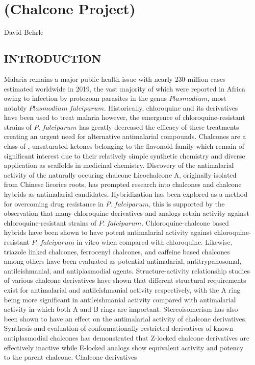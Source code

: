 \documentclass[11pt]{article}
\begin{document}
\linespread{1.25}
\raggedright
\setlength{\parskip}{2pt}
\setlength{\belowcaptionskip}{-8pt}
\def\citenumfont{\textit}
\renewcommand{\bibsection}{}

\section*{(Chalcone Project)}

David Behrle

\subsection*{INTRODUCTION}
Malaria remains a major public health issue with nearly 230 million cases estimated worldwide in 2019, the vast majority of which were reported in Africa owing to infection by protozoan parasites in the genus $Plasmodium$, most notably $Plasmodium\; falciparum$.\cite{Fikadu2023} Historically, chloroquine and its derivatives have been used to treat malaria however, the emergence of chloroquine-resistant strains of $P.\; falciparum$ has greatly decreased the efficacy of these treatments creating an urgent need for alternative antimalarial compounds.\cite{Fikadu2023,Yadav2012} Chalcones are a class of \textalpha,\textbeta-unsaturated ketones belonging to the flavonoid family which remain of significant interest due to their relatively simple synthetic chemistry and diverse application as scaffolds in medicinal chemistry.\cite{Qin2020} Discovery of the antimalarial activity of the naturally occuring chalcone Licochalcone A, originally isolated from Chinese licorice roots, has prompted research into chalcones and chalcone hybrids as antimalarial candidates.\cite{Cheng2020,Chen1994} Hybridization has been explored as a method for overcoming drug resistance in $P.\; falciparum$, this is supported by the observation that many chloroquine derivatives and analogs retain activity against chloroquine-resistant strains of $P.\; falciparum$.\cite{Cheng2020,Sashidhara2012} Chloroquine-chalcone based hybrids have been shown to have potent antimalarial activity against chloroquine-resistant $P.\; falciparum$ in vitro when compared with chloroquine.\cite{Sashidhara2012} Likewise, triazole linked chalcones, ferrocenyl chalcones, and caffeine based chalcones among others have been evaluated as potential antimalarial, antitrypanosomal, antileishmanial, and antiplasmodial agents.\cite{Qin2020,Singh2017,Insuasty2015} Structure-activity relationship studies of various chalcone derivatives have shown that different structural requirements exist for antimalarial and antileishmanial activity respectively, with the A ring being more significant in antileishmanial activity compared with antimalarial activity in which both A and B rings are important.\cite{Liu2003} Stereoisomerism has also been shown to have an effect on the antimalarial activity of chalcone derivatives. Synthesis and evaluation of conformationally restricted derivatives of known antiplasmodial chalcones has demonstrated that Z-locked chalcone derivatives are effectively inactive while E-locked analogs show equivalent activity and potency to the parent chalcone.\cite{Larsen2005} Chalcone derivatives 
\end{document}
